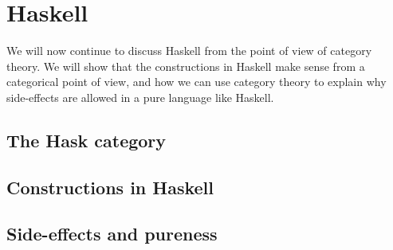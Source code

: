 \documentclass[../thesis.tex]{subfiles}
\begin{document}
\chapter{Haskell}

We will now continue to discuss Haskell from the point of view of category theory.
We will show that the constructions in Haskell make sense from a categorical point of view, and how we can use category theory to explain why side-effects are allowed in a pure language like Haskell.

\section{The Hask category}

\section{Constructions in Haskell}

\section{Side-effects and pureness}
\end{document}
